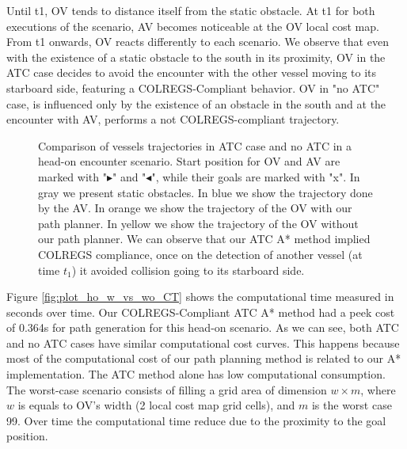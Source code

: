         Until t1, \ac{OV} tends to distance itself from the static obstacle. At t1 for both executions of the scenario, \ac{AV} becomes noticeable at the \ac{OV} local cost map. From t1 onwards, \ac{OV} reacts differently to each scenario. We observe that even with the existence of a static obstacle to the south in its proximity, \ac{OV} in the \ac{ATC} case decides to avoid the encounter with the other vessel moving to its starboard side, featuring a \ac{COLREGS}-Compliant behavior. \ac{OV} in "no ATC" case, is influenced only by the existence of an obstacle in the south and at the encounter with \ac{AV}, performs a not \ac{COLREGS}-compliant trajectory.
        
        \begin{figure}
            \centering
            
            \caption{Comparison of vessels trajectories in \ac{ATC} case and no \ac{ATC} in a head-on encounter scenario. Start position for \ac{OV} and \ac{AV} are marked with "$\blacktriangleright$" and "$\blacktriangleleft$", while their goals are marked with "x". In gray we present static obstacles. In blue we show the trajectory done by the \ac{AV}. In orange we show the trajectory of the \ac{OV} with our path planner. In yellow we show the trajectory of the \ac{OV} without our path planner. We can observe that our \ac{ATC} A* method implied \ac{COLREGS} compliance, once on the detection of another vessel (at time $t_1$) it avoided collision going to its starboard side.}
            \label{fig:plot_ho_w_vs_wo}
        \end{figure}
        
        Figure \ref{fig:plot_ho_w_vs_wo_CT} shows the computational time measured in seconds over time. Our \ac{COLREGS}-Compliant \ac{ATC} A* method had a peek cost of 0.364s for path generation for this head-on scenario. As we can see, both \ac{ATC} and no \ac{ATC} cases have similar computational cost curves. This happens because most of the computational cost of our path planning method is related to our A* implementation. The \ac{ATC} method alone has low computational consumption. The worst-case scenario consists of filling a grid area of dimension $w \times m$, where $w$ is equals to \ac{OV}'s width (2 local cost map grid cells), and $m$ is the worst case 99. Over time the computational time reduce due to the proximity to the goal position.
        
